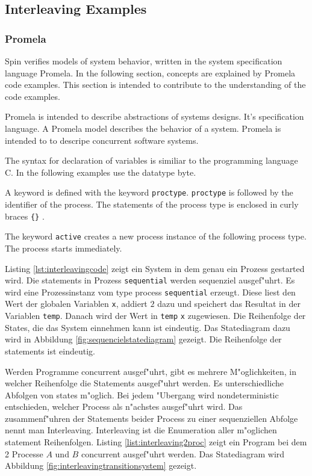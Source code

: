 \documentclass[a4paper, twoside]{article}
\begin{document}
\subsection{Interleaving Examples}
\label{sec:interleavingexamples}

\subsubsection{Promela}
\label{sec:promela}

Spin verifies models of system behavior, written in the system specification language Promela. In the following section, concepts are explained by Promela code examples. This section is intended to contribute to the understanding of the code examples.

Promela is intended to describe abstractions of systems designs. It's specification language. A Promela model describes the behavior of a system. Promela is intended to to descripe concurrent software systems.

The syntax for declaration of variables is similiar to the programming language C. In the following examples use the datatype byte.

A keyword is defined with the keyword \verb|proctype|. \verb|proctype| is followed by the identifier of the process. The statements of the process type is enclosed in curly braces \verb|{}| \cite{holzmann03}.

The keyword \verb|active| creates a new process instance of the following process type. The process starts immediately.



Listing \ref{lst:interleavingcode} zeigt ein System in dem genau ein Prozess gestarted wird. Die statements in Prozess \verb|sequential| werden sequenziel ausgef"uhrt. Es wird eine Prozessinstanz vom type process \verb|sequential| erzeugt. Diese liest den Wert der globalen Variablen \verb|x|, addiert $2$ dazu und speichert das Resultat in der Variablen \verb|temp|. Danach wird der Wert in \verb|temp| \verb|x| zugewiesen. Die Reihenfolge der States, die das System einnehmen kann ist eindeutig. Das Statediagram dazu wird in Abbildung \ref{fig:sequencielstatediagram} gezeigt. Die Reihenfolge der statements ist eindeutig.

   

Werden Programme concurrent ausgef"uhrt, gibt es mehrere M"oglichkeiten, in welcher Reihenfolge die Statements ausgef"uhrt werden. Es unterschiedliche Abfolgen von states m"oglich. Bei jedem "Ubergang wird nondeterministic entschieden, welcher Process als n"achstes ausgef"uhrt wird. Das zusammenf"uhren der Statements beider Process zu einer sequenziellen Abfolge nennt man Interleaving. Interleaving ist die Enumeration aller m"oglichen statement Reihenfolgen. Listing \ref{list:interleaving2proc} zeigt ein Program bei dem 2 Processe $A$ und $B$ concurrent ausgef"uhrt werden. Das Statediagram wird Abbildung \ref{fig:interleavingtransitionsystem} gezeigt.
\end{document}

